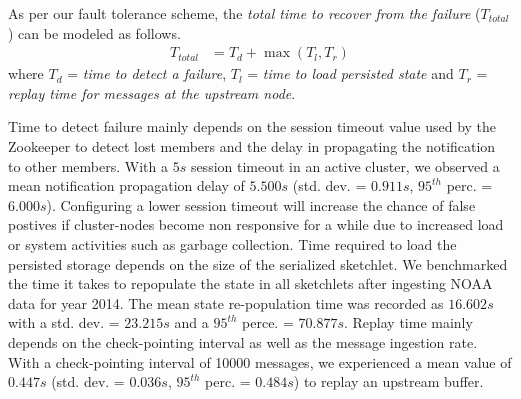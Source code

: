 As per our fault tolerance scheme, the \textit{total time to recover from the failure} ($T_{total}$) can be modeled as follows.
\begin{align*}
    T_{total} &= T_{d} + \max{(T_{l}, T_{r})}      
\end{align*}
where $T_{d}$ = \textit{time to detect a failure}, $T_{l}$ = \textit{time to load persisted state} and $T_{r}$ = \textit{replay time for messages at the upstream node}.

Time to detect failure mainly depends on the session timeout value used by the Zookeeper to detect lost members and the delay in propagating the notification to other members. With a $5s$ session timeout in an active cluster, we observed a mean notification propagation delay of $5.500s$ (std. dev. = $0.911s$, $95^{th}$ perc. = $6.000s$). Configuring a lower session timeout will increase the chance of false postives if cluster-nodes become non responsive for a while due to increased load or system activities such as garbage collection. Time required to load the persisted storage depends on the size of the serialized sketchlet. We benchmarked the time it takes to repopulate the state in all sketchlets after ingesting NOAA data for year 2014. The mean state re-population time was recorded as $16.602s$ with a std. dev. = $23.215s$ and a $95^{th}$ perce. = $70.877s$. Replay time mainly depends on the check-pointing interval as well as the message ingestion rate. With a check-pointing interval of 10000 messages, we experienced a mean value of $0.447s$ (std. dev. = $0.036s$, $95^{th}$ perc. = $0.484s$) to replay an upstream buffer.  														


